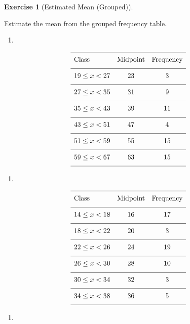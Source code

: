 \documentclass[
  letterpaper,
  DIV=11,
  numbers=noendperiod]{scrreprt}
\providecommand{\tightlist}{%
  \setlength{\itemsep}{0pt}\setlength{\parskip}{0pt}}
\theoremstyle{definition}
\newtheorem{exercise}{Exercise}[chapter]
\theoremstyle{remark}
\begin{document}
\begin{exercise}[Estimated Mean
(Grouped)]\protect\hypertarget{exr-grp-1}{}\label{exr-grp-1}

Estimate the mean from the grouped frequency table.

\begin{enumerate}
\def\labelenumi{\alph{enumi})}
\tightlist
\item
\end{enumerate}

\[{\renewcommand{\arraystretch}{1.6}\begin{array}{lcc}
\hline \text{Class} & \text{Midpoint} & \text{Frequency} \\[4pt]
\hline 19 \leq x < 27  & 23 & 3 \\[4pt]
\hline 27 \leq x < 35  & 31 & 9 \\[4pt]
\hline 35 \leq x < 43  & 39 & 11 \\[4pt]
\hline 43 \leq x < 51  & 47 & 4 \\[4pt]
\hline 51 \leq x < 59  & 55 & 15 \\[4pt]
\hline 59 \leq x < 67  & 63 & 15 \\[4pt]
\hline \end{array}}\]

\begin{enumerate}
\def\labelenumi{\alph{enumi})}
\setcounter{enumi}{1}
\tightlist
\item
\end{enumerate}

\[{\renewcommand{\arraystretch}{1.6}\begin{array}{lcc}
\hline \text{Class} & \text{Midpoint} & \text{Frequency} \\[4pt]
\hline 14 \leq x < 18  & 16 & 17 \\[4pt]
\hline 18 \leq x < 22  & 20 & 3 \\[4pt]
\hline 22 \leq x < 26  & 24 & 19 \\[4pt]
\hline 26 \leq x < 30  & 28 & 10 \\[4pt]
\hline 30 \leq x < 34  & 32 & 3 \\[4pt]
\hline 34 \leq x < 38  & 36 & 5 \\[4pt]
\hline \end{array}}\]

\begin{enumerate}
\def\labelenumi{\alph{enumi})}
\setcounter{enumi}{2}
\tightlist
\item
\end{enumerate}


\end{exercise}
\end{document}
